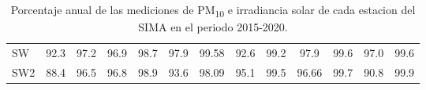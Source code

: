\begin{table}[H]
\begin{tabular}{lcccccccccccc}
SW                                         & 92.3       & 97.2      & 96.9       & 98.7       & 97.9                                                 & 99.58                                                & 92.6        & 99.2       & 97.9  & 99.6                                                 & 97.0                                                & 99.6 \\
SW2                                        & 88.4       & 96.5      & 96.8       & 98.9       & 93.6                                                 & 98.09                                                & 95.1        & 99.5       & 96.66 & 99.7                                                 & 90.8                                                & 99.9 \\ \hline
\end{tabular}
\caption{Porcentaje anual de las mediciones de PM\textsubscript{10} e irradiancia solar de cada estacion del SIMA en el periodo 2015-2020.}
\label{table:measurements_SIMA}
\end{table}